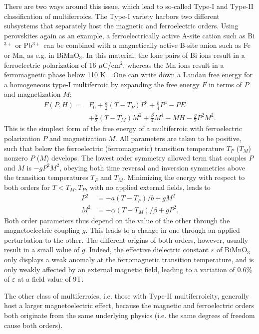 There are two ways around this issue, which lead to so-called Type-I and Type-II classification of multiferroics\cite{Khomskii2009}.
The Type-I variety harbors two different subsystems that separately host the magnetic and ferroelectric orders.
Using perovskites again as an example, a ferroelectrically active A-site cation such as Bi$^{3+}$ or Pb$^{3+}$ can be combined with a magnetically active B-site anion such as Fe or Mn, as e.g. in BiMnO$_3$. In this material, the lone pairs of Bi ions result in a ferroelectric polarization of 16 $\mu$C/cm$^2$, whereas the Mn ions result in a ferromagnetic phase below 110 K~\cite{Wang2009}.
One can write down a Landau free energy for a homogeneous type-I multiferroic by expanding the free energy $F$ in terms of $P$ and magnetization $M$:
\begin{align}
	F(P, H) =& F_0 + \frac{a}{2} (T-T_P) P^2 + \frac{b}{4} P^4 - P E \\
	&+\frac{\alpha}{2} (T-T_M)M^2 + \frac{\beta}{4} M^4 - MH - \frac{g}{2}P^2 M^2.
\end{align}
This is the simplest form of the free energy of a multiferroic with ferroelectric polarization $P$ and magnetization $M$. All parameters are taken to be positive, such that below the ferroelectric (ferromagnetic) transition temperature $T_P$ ($T_M$) nonzero $P$ ($M$) develops.
The lowest order symmetry allowed term that couples $P$ and $M$ is $-gP^2M^2$, obeying both time reversal and inversion symmetries above the transition temperatures $T_P$ and $T_M$.
Minimizing the energy with respect to both orders for $T<T_M,T_P$, with no applied external fields, leads to
\begin{align}
	P^2 &= - a(T-T_P)/b + gM^2\\
	M^2 &= - \alpha(T-T_M)/\beta + gP^2.
\end{align}
Both order parameters thus depend on the value of the other through the magnetoelectric coupling $g$. This leads to a change in one through an applied perturbation to the other.
The different origins of both orders, however, usually result in a small value of $g$. Indeed, the effective dielectric constant $\varepsilon$ of BiMnO$_3$ only displays a weak anomaly at the ferromagnetic transition temperature, and is only weakly affected by an external magnetic field, leading to a variation of 0.6\% of $\varepsilon$ at a field value of 9T.

The other class of multiferroics, i.e. those with Type-II multiferroicity, generally host a larger magnetoelectric effect, because the magnetic and ferroelectric orders both originate from the same underlying physics (i.e. the same degrees of freedom cause both orders).

